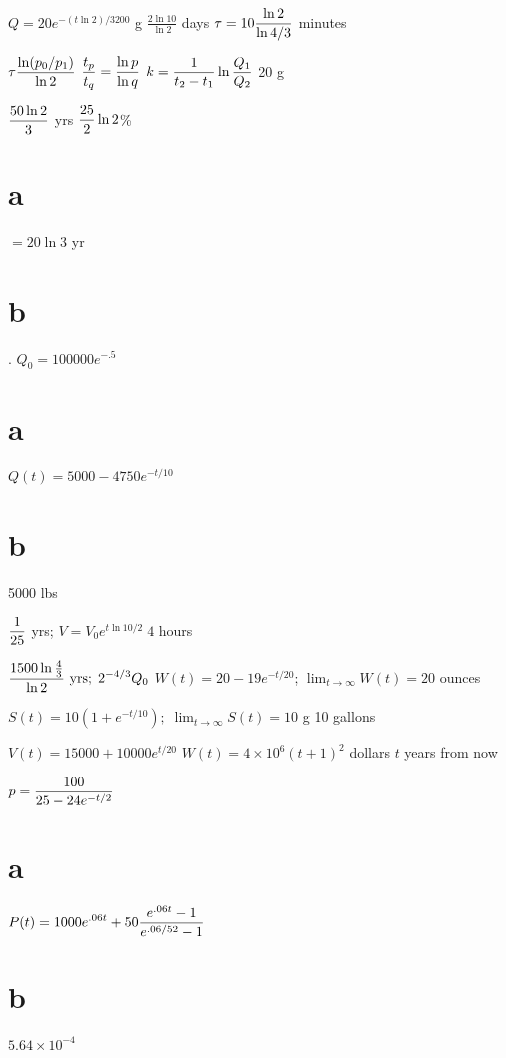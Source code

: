 \medskip

 $Q=20e^{-(t\ln2)/3200}$ g
   $\frac{2\ln10}{\ln2}$ days
  $\displaystyle{\tau=10{\frac{\ln2}{\ln4/3}}}$ minutes

 $\displaystyle{\tau{\frac{\ln(p_{0}/p_{1})}{\ln2}}}$
  $\displaystyle{\frac{t_{p}}{t_{q}}=\frac{\ln p}{\ln q}}$
  $\displaystyle{k=\frac{1}{t_{2}-t_{1}}\ln\frac{Q_{1}}{Q_{2}}}$
  20 g

  $\displaystyle{\frac{50
\ln2}{3}}$ yrs
  $\displaystyle{\frac{25}{2}\ln2}$\%

\part{a} $=20\ln3$ yr
  \part{b}.
 $Q_{0}=100000e^{-.5}$
\part{a} $Q(t)=5000-4750e^{-t/10}$ \part{b} 5000 lbs

 $\displaystyle\frac{1}{25}$ yrs;
 $V=V_{0}e^{t\ln10/2}\;
   4$ hours

 $\displaystyle{\frac{1500\ln\frac{4}{3}}{\ln2}}\mbox{ yrs};\;2^{-4/3}Q_{0}$
 $W(t)=20-19e^{-t/20}$; $\lim_{t\to\infty}W(t)=20$  ounces

 $S(t)=10(1+e^{-t/10});\;\lim_{t\to\infty}S(t)=10$ g
 10 gallons

 $V(t)=15000+10000e^{t/20}$
$W(t)=4\times10^{6}(t+1)^{2}$ dollars $t$  years from now

 $\displaystyle{p=\frac{100}{25-24e^{-t/2}}}$
\part{a} $\displaystyle{P(t)=1000e^{.06t}+50{\frac{e^{.06t}-1}{e^{.06/52}-1}}}$
\part{b} $5.64\times10^{-4}$

